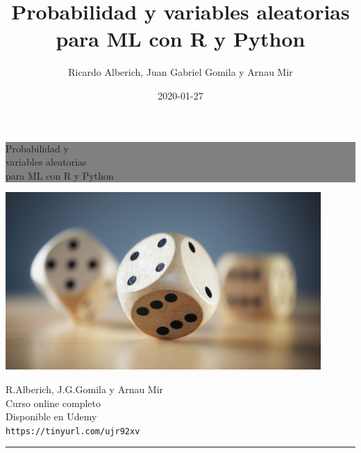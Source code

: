 \documentclass[]{book}
\title{Probabilidad y variables aleatorias para ML con R y Python}
\author{Ricardo Alberich, Juan Gabriel Gomila y Arnau Mir}
\date{2020-01-27}
\begin{document}
\maketitle

\begin{titlepage} %


	\colorbox{grey}{
		\parbox[t]{0.93\textwidth}{ %
			\parbox[t]{0.91\textwidth}{ %
				\raggedleft %
				\fontsize{30pt}{50pt}\selectfont %
				\vspace{0.7cm} %

				Probabilidad y \\
				variables aleatorias \\
				para ML con R y Python\\

				\vspace{0.7cm} %
			}
		}
	}
    \centering

    \includegraphics[width=12cm]{Images/cover.jpg} %


	\vfill %


	\parbox[t]{0.93\textwidth}{ %
		\raggedleft %
		\large %
		{\Large R.Alberich, J.G.Gomila y Arnau Mir}\\[4pt] %
		Curso online completo\\
		Disponible en Udemy\\[4pt] %
		\texttt{https://tinyurl.com/ujr92xv}\\

		\hfill\rule{0.2\linewidth}{1pt}%
	}

\end{titlepage}
\end{document}
